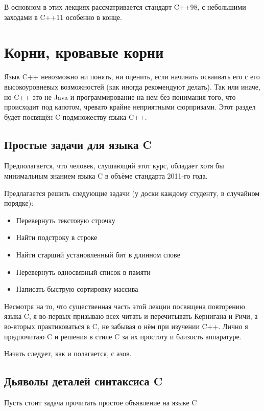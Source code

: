 \documentclass[a4paper,12pt,oneside]{article}
\begin{document}
В основном в этих лекциях рассматривается стандарт C++98, с небольшими заходами в C++11 особенно в конце.

\pagebreak
\section{Корни, кровавые корни}

Язык C++ невозможно ни понять, ни оценить, если начинать осваивать его с его высокоуровневых возможностей (как иногда рекомендуют делать). Так или иначе, но C++ это не Java и программирование на нем без понимания того, что происходит под капотом, чревато крайне неприятными сюрпризами. Этот раздел будет посвящён C-подмножеству языка C++.

\subsection{Простые задачи для языка C}

Предполагается, что человек, слушающий этот курс, обладает хотя бы минимальным знанием языка C в объёме стандарта 2011-го года.

Предлагается решить следующие задачи (у доски каждому студенту, в случайном порядке):

\begin{itemize}
\item
Перевернуть текстовую строчку
\item
Найти подстроку в строке
\item
Найти старший установленный бит в длинном слове
\item
Перевернуть односвязный список в памяти
\item
Написать быструю сортировку массива
\end{itemize}

Несмотря на то, что существенная часть этой лекции посвящена повторению языка C, я во-первых призываю всех читать и перечитывать Кернигана и Ричи, а во-вторых практиковаться в C, не забывая о нём при изучении C++. Лично я предпочитаю C и решения в стиле C за их простоту и близость аппаратуре.

Начать следует, как и полагается, с азов.

\subsection{Дьяволы деталей синтаксиса C}

Пусть стоит задача прочитать простое объявление на языке C
\end{document}
